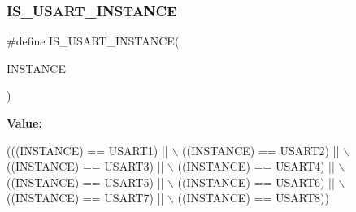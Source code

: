 \subsubsection{\texorpdfstring{I\+S\+\_\+\+U\+S\+A\+R\+T\+\_\+\+I\+N\+S\+T\+A\+N\+CE}{IS\_USART\_INSTANCE}\hspace{0.1cm}{\footnotesize\ttfamily [13/13]}}
{\footnotesize\ttfamily \#define I\+S\+\_\+\+U\+S\+A\+R\+T\+\_\+\+I\+N\+S\+T\+A\+N\+CE(\begin{DoxyParamCaption}\item[{}]{I\+N\+S\+T\+A\+N\+CE }\end{DoxyParamCaption})}

{\bfseries Value\+:}
\begin{DoxyCode}
(((INSTANCE) == USART1) || \(\backslash\)
                                     ((INSTANCE) == USART2) || \(\backslash\)
                                     ((INSTANCE) == USART3) || \(\backslash\)
                                     ((INSTANCE) == USART4) || \(\backslash\)
                                     ((INSTANCE) == USART5) || \(\backslash\)
                                     ((INSTANCE) == USART6) || \(\backslash\)
                                     ((INSTANCE) == USART7) || \(\backslash\)
                                     ((INSTANCE) == USART8))
\end{DoxyCode}
